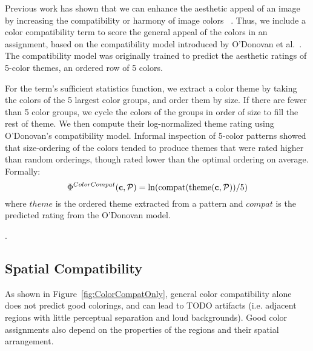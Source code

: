 Previous work has shown that we can enhance the aesthetic appeal of an image by increasing the compatibility or harmony of image colors ~\cite{CohenOrHarmonization,DressUp,ColorizationUsingHarmony,ODonovan}. Thus, we include a color compatibility term to score the general appeal of the colors in an assignment, based on the compatibility model introduced by O'Donovan et al.~. The compatibility model was originally trained to predict the aesthetic ratings of 5-color themes, an ordered row of 5 colors. 

For the term's sufficient statistics function, we extract a color theme by taking the colors of the 5 largest color groups, and order them by size. If there are fewer than 5 color groups, we cycle the colors of the groups in order of size to fill the rest of theme. We then compute their log-normalized theme rating using O'Donovan's compatibility model. Informal inspection of 5-color patterns showed that size-ordering of the colors tended to produce themes that were rated higher than random orderings, though rated lower than the optimal ordering on average. Formally:
\begin{equation*}
\Phi^{ColorCompat}(\mathbf{c}, \mathcal{P}) = \ln(\text{compat}(\text{theme}(\mathbf{c}, \mathcal{P}))/5)
\end{equation*}
where $theme$ is the ordered theme extracted from a pattern and $compat$ is the predicted rating from the O'Donovan model.~

.


\subsection{Spatial Compatibility}
\label{sec:spatialCompat}

As shown in Figure~\ref{fig:ColorCompatOnly}, general color compatibility alone does not predict good colorings, and can lead to TODO artifacts (i.e. adjacent regions with little perceptual separation and loud backgrounds). Good color assignments also depend on the properties of the regions and their spatial arrangement. 

